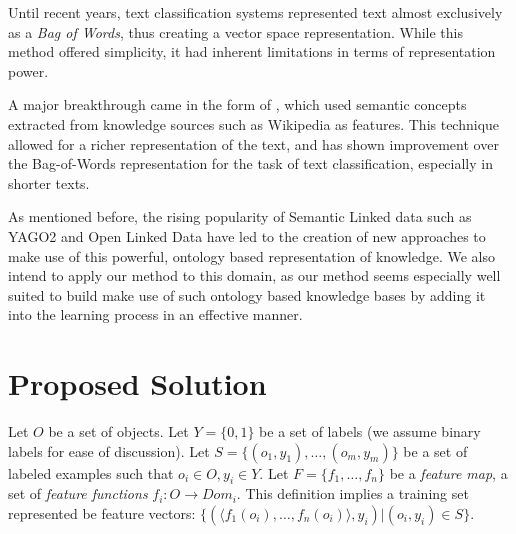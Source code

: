 \documentclass[12pt, a4paper]{article}
\theoremstyle{definition}
\begin{document}
Until recent years, text classification systems represented text almost exclusively as a \emph{Bag of Words}, thus creating a vector space representation\citep{salton1983introduction,Wu:1981:CST:1013228.511759}. While this method offered simplicity, it had inherent limitations in terms of representation power.

A major breakthrough came in the form of \citet{gabrilovich2006overcoming}, which used semantic concepts extracted from knowledge sources such as Wikipedia as features. This technique allowed for a richer representation of the text, and has shown improvement over the Bag-of-Words representation for the task of text classification, especially in shorter texts.

As mentioned before, the rising popularity of Semantic Linked data such as YAGO2\citep{hoffart2013yago2} and Open Linked Data\citep{bizer2009linked} have led to the creation of new approaches to make use of this powerful, ontology based representation of knowledge\citep{losch2012graph,rios2014statistical}.
We also intend to apply our method to this domain, as our method seems especially well suited to build make use of such ontology based knowledge bases by adding it into the learning process in an effective manner.

\section{Proposed Solution}

Let $O$ be a set of objects. Let $Y=\{0,1\}$ be a set of labels (we assume binary labels for ease of discussion). Let $S=\{(o_{1},y_{1}),\ldots,(o_{m},y_{m})\}$ be a set of labeled examples such that $o_{i}\in O, y_{i}\in Y$. Let $F=\{f_{1},\ldots,f_{n}\}$ be a \emph{feature map}, a set of \emph{feature functions} $f_{i}:O\rightarrow Dom_{i}$.  This definition implies a training set represented be feature vectors: $\{ (\langle f_1(o_i),\ldots,f_n(o_i)\rangle, y_i) | (o_i,y_i) \in S\}$.

\end{document}
